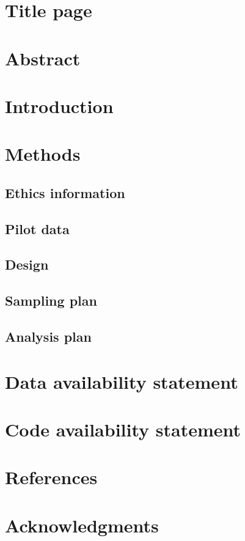 \documentclass{article}
\begin{document}
\section{Title page}

\section{Abstract}

\section{Introduction} %


\section{Methods}
\subsection{Ethics information}
\subsection{Pilot data}
\subsection{Design}
\subsection{Sampling plan}
\subsection{Analysis plan}

\section{Data availability statement}

\section{Code availability statement}

\section{References}

\section{Acknowledgments}
\end{document}

